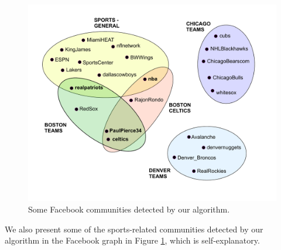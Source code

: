\begin{figure}%
  \centering
    \includegraphics[scale=0.5]{communities_fb_new.pdf}
    
  \caption{Some Facebook communities detected by our algorithm.}
\label{fig-communities-fb}
\end{figure}

We also present some of the sports-related communities detected by our algorithm in the Facebook graph in Figure \ref{fig-communities-fb}, which is self-explanatory.




